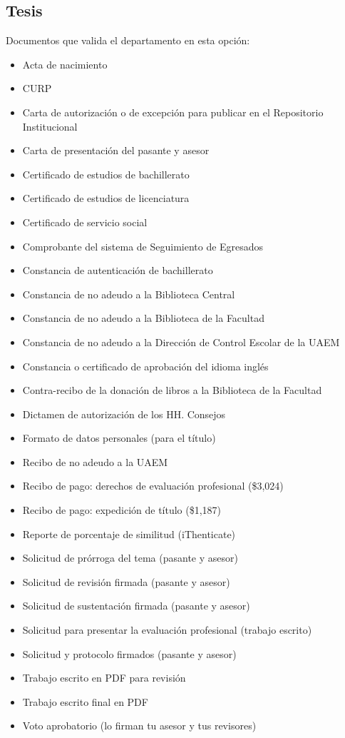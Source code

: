 \subsection{Tesis}
Documentos que valida el departamento en esta opción:
\begin{itemize}
  \item Acta de nacimiento
  \item CURP
  \item Carta de autorización o de excepción para publicar en el Repositorio Institucional
  \item Carta de presentación del pasante y asesor
  \item Certificado de estudios de bachillerato
  \item Certificado de estudios de licenciatura
  \item Certificado de servicio social
  \item Comprobante del sistema de Seguimiento de Egresados
  \item Constancia de autenticación de bachillerato
  \item Constancia de no adeudo a la Biblioteca Central
  \item Constancia de no adeudo a la Biblioteca de la Facultad
  \item Constancia de no adeudo a la Dirección de Control Escolar de la UAEM
  \item Constancia o certificado de aprobación del idioma inglés
  \item Contra-recibo de la donación de libros a la Biblioteca de la Facultad
  \item Dictamen de autorización de los HH. Consejos
  \item Formato de datos personales (para el título)
  \item Recibo de no adeudo a la UAEM
  \item Recibo de pago: derechos de evaluación profesional (\$3,024)
  \item Recibo de pago: expedición de título (\$1,187)
  \item Reporte de porcentaje de similitud (iThenticate)
  \item Solicitud de prórroga del tema (pasante y asesor)
  \item Solicitud de revisión firmada (pasante y asesor)
  \item Solicitud de sustentación firmada (pasante y asesor)
  \item Solicitud para presentar la evaluación profesional (trabajo escrito)
  \item Solicitud y protocolo firmados (pasante y asesor)
  \item Trabajo escrito en PDF para revisión
  \item Trabajo escrito final en PDF
  \item Voto aprobatorio (lo firman tu asesor y tus revisores)
\end{itemize}

